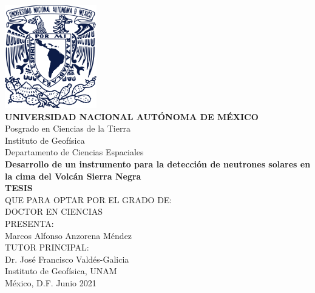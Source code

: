\begin{titlepage}

\begin{center}

	\vspace{-1cm}
  \includegraphics[height=4.5cm]{unam.pdf}\\[20pt]
	\textbf{\Large UNIVERSIDAD NACIONAL AUTÓNOMA DE MÉXICO}\\
	\large Posgrado en Ciencias de la Tierra\\
	\large Instituto de Geofísica\\
	\large Departamento de Ciencias Espaciales\\[35pt]
	\textbf{\Large Desarrollo de un instrumento para la detección de neutrones solares en la cima
	del Volcán Sierra Negra}\\[40pt]
	\textbf{\Large TESIS}\\[10pt]
  \large QUE PARA OPTAR POR EL GRADO DE:\\
  \large DOCTOR EN CIENCIAS\\[25pt]
  \large PRESENTA:\\
	\large  Marcos Alfonso Anzorena Méndez\\[30pt]
  \large TUTOR PRINCIPAL:\\
  \large  Dr. José Francisco Valdés-Galicia\\
  \large  Instituto de Geofísica, UNAM\\[35pt]
  México, D.F. Junio 2021

\end{center}








\end{titlepage}

